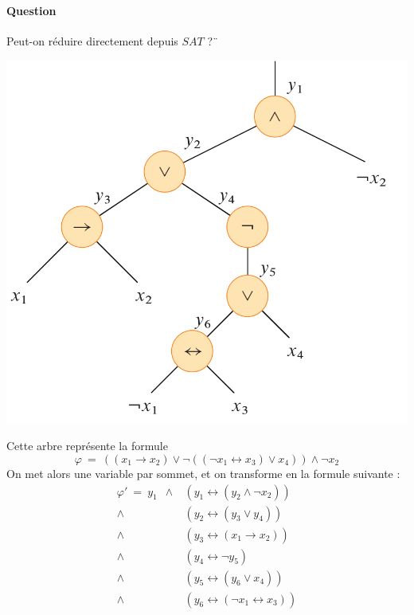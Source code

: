 \paragraph{Question} Peut-on réduire directement depuis $SAT$ ?¨ \\
\begin{minipage}{0.5\linewidth}
	\includegraphics[width = \linewidth]{Developpements/3 SAT/exemple_formule_cormen.png}
\end{minipage}\begin{minipage}{0.5\linewidth}
	Cette arbre représente la formule $$ \varphi \: = \: ((x_1 \to x_2) \vee \neg  ((\neg x_1 \leftrightarrow x_3) \vee x_4)) \wedge \neg x_2$$
	On met alors une variable par sommet, et on transforme en la formule suivante :
	$$\begin{array}{rl}
		\varphi' \: = \: y_1 \enspace \wedge & (y_1 \leftrightarrow (y_2 \wedge \neg x_2))\\
		\wedge & (y_2 \leftrightarrow (y_3 \vee y_4))\\
		\wedge & (y_3 \leftrightarrow (x_1 \to x_2)) \\
		\wedge & (y_4 \leftrightarrow \neg y_5) \\
		\wedge & (y_5 \leftrightarrow (y_6 \vee x_4))\\
		\wedge & (y_6 \leftrightarrow (\neg x_1 \leftrightarrow x_3))
	\end{array}$$
\end{minipage}
